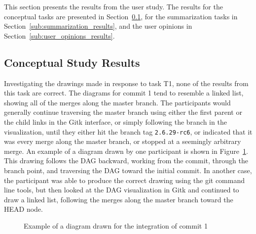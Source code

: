 This section presents the results from the user study. The results for
the conceptual tasks are presented in
Section~\ref{sub:conceptual_results}, for the summarization tasks in
Section~\ref{sub:summarization_results}, and the user opinions in
Section~\ref{sub:user_opinions_results}.

\subsection{Conceptual Study Results}
\label{sub:conceptual_results}

Investigating the drawings made in response to task T1, none of the
results from this task are correct. The diagrams for commit 1 tend to
resemble a linked list, showing all of the merges along the master
branch. The participants would generally continue traversing the master
branch using either the first parent or the child links in the Gitk
interface, or simply following the branch in the visualization, until
they either hit the branch tag \verb|2.6.29-rc6|, or indicated that it
was every merge along the master branch, or stopped at a seemingly
arbitrary merge. An example of a diagram drawn by one participant is
shown in Figure~\ref{fig:commit_1_fig}. This drawing follows the DAG
backward, working from the commit, through the branch point, and
traversing the DAG toward the initial commit. In another case, the
participant was able to produce the correct drawing using the git
command line tools, but then looked at the DAG visualization in Gitk and
continued to draw a linked list, following the merges along the master
branch toward the HEAD node.

\begin{figure}[htpb]
  \centering


  \caption{Example of a diagram drawn for the integration of commit 1}
  \label{fig:commit_1_fig}
\end{figure}

